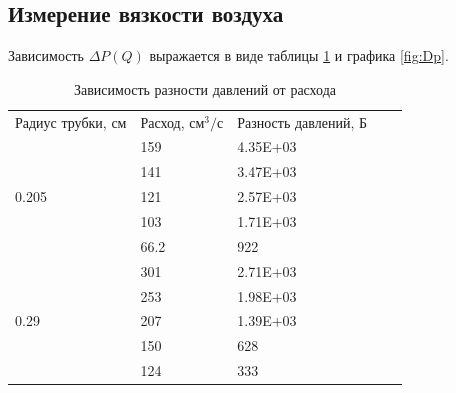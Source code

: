 \documentclass[a4paper]{article}
\begin{document}
\subsection{Измерение вязкости воздуха}
Зависимость $\Delta P(Q)$ выражается в виде таблицы \ref{tab:Dp} и графика \ref{fig:Dp}.
\begin{table}[htbp]
	\centering
	\begin{tabular}{lllll}
\cline{1-3}
\multicolumn{1}{|l|}{Радиус трубки, см}      & \multicolumn{1}{l|}{Расход, $см^3/с$} & \multicolumn{1}{l|}{Разность давлений, Б} &  &  \\ \cline{1-3}
\multicolumn{1}{|l|}{\multirow{5}{*}{0.205}} & \multicolumn{1}{l|}{159}          & \multicolumn{1}{l|}{4.35E+03}             &  &  \\ \cline{2-3}
\multicolumn{1}{|l|}{}                       & \multicolumn{1}{l|}{141}          & \multicolumn{1}{l|}{3.47E+03}             &  &  \\ \cline{2-3}
\multicolumn{1}{|l|}{}                       & \multicolumn{1}{l|}{121}          & \multicolumn{1}{l|}{2.57E+03}             &  &  \\ \cline{2-3}
\multicolumn{1}{|l|}{}                       & \multicolumn{1}{l|}{103}          & \multicolumn{1}{l|}{1.71E+03}             &  &  \\ \cline{2-3}
\multicolumn{1}{|l|}{}                       & \multicolumn{1}{l|}{66.2}         & \multicolumn{1}{l|}{922}                  &  &  \\ \cline{1-3}
\multicolumn{1}{|l|}{\multirow{5}{*}{0.29}}  & \multicolumn{1}{l|}{301}          & \multicolumn{1}{l|}{2.71E+03}             &  &  \\ \cline{2-3}
\multicolumn{1}{|l|}{}                       & \multicolumn{1}{l|}{253}          & \multicolumn{1}{l|}{1.98E+03}             &  &  \\ \cline{2-3}
\multicolumn{1}{|l|}{}                       & \multicolumn{1}{l|}{207}          & \multicolumn{1}{l|}{1.39E+03}             &  &  \\ \cline{2-3}
\multicolumn{1}{|l|}{}                       & \multicolumn{1}{l|}{150}          & \multicolumn{1}{l|}{628}                  &  &  \\ \cline{2-3}
\multicolumn{1}{|l|}{}                       & \multicolumn{1}{l|}{124}          & \multicolumn{1}{l|}{333}                  &  &  \\ \cline{1-3}
\end{tabular}
	\caption{Зависимость разности давлений от расхода}
	\label{tab:Dp}
\end{table}
\end{document}

